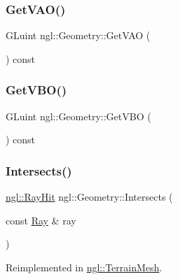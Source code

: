 \mbox{\label{classngl_1_1_geometry_a220a013619c3722b7453da820cd447c6}} 
\subsubsection{\texorpdfstring{Get\+V\+A\+O()}{GetVAO()}}
{\footnotesize\ttfamily G\+Luint ngl\+::\+Geometry\+::\+Get\+V\+AO (\begin{DoxyParamCaption}{ }\end{DoxyParamCaption}) const}

\mbox{\label{classngl_1_1_geometry_afa97818f3605182572759293ca11a0c5}} 
\subsubsection{\texorpdfstring{Get\+V\+B\+O()}{GetVBO()}}
{\footnotesize\ttfamily G\+Luint ngl\+::\+Geometry\+::\+Get\+V\+BO (\begin{DoxyParamCaption}{ }\end{DoxyParamCaption}) const}

\mbox{\label{classngl_1_1_geometry_a494c5a8210176ae8cf02c5398e4f4bde}} 
\subsubsection{\texorpdfstring{Intersects()}{Intersects()}}
{\footnotesize\ttfamily \mbox{\hyperlink{classngl_1_1_ray_hit}{ngl\+::\+Ray\+Hit}} ngl\+::\+Geometry\+::\+Intersects (\begin{DoxyParamCaption}\item[{const \mbox{\hyperlink{classngl_1_1_ray}{Ray}} \&}]{ray }\end{DoxyParamCaption})\hspace{0.3cm}{\ttfamily [virtual]}}



Reimplemented in \mbox{\hyperlink{classngl_1_1_terrain_mesh_ace57d898dc60e94330ef4f46e54abe2e}{ngl\+::\+Terrain\+Mesh}}.

